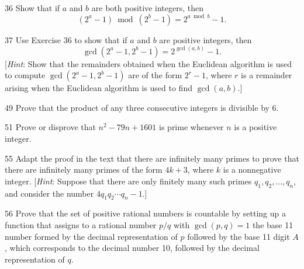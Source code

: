\documentclass[11pt]{article}
\begin{document}
\begin{exercise}{36}
    Show that if $a$ and $b$ are both positive integers, then
    \[
    (2^a - 1) \bmod (2^b - 1) = 2^{a \bmod b} - 1.
    \]
\end{exercise}

\begin{exercise}{37}
    Use Exercise 36 to show that if $a$ and $b$ are positive
    integers, then
    \[
    \gcd(2^a - 1, 2^b - 1) = 2^{\gcd(a,b)} - 1.
    \]
    [\emph{Hint}: Show that the remainders obtained when the
    Euclidean algorithm is used to compute
    $\gcd(2^a-1, 2^b-1)$ are of the form $2^r - 1$, where $r$ is a
    remainder arising when the Euclidean algorithm is used to find
    $\gcd(a,b)$.]
\end{exercise}

\begin{exercise}{49}
    Prove that the product of any three consecutive integers is
    divisible by 6.
\end{exercise}

\begin{exercise}{51}
    Prove or disprove that $n^2 - 79n + 1601$ is prime whenever $n$
    is a positive integer.
\end{exercise}

\begin{exercise}{55}
    Adapt the proof in the text that there are infinitely many primes
    to prove that there are infinitely many primes of the form
    $4k+3$, where $k$ is a nonnegative integer.
    [\emph{Hint}: Suppose that there are only finitely many such
    primes $q_1, q_2, \dots, q_n$, and consider the number
    $4q_1 q_2 \cdots q_n - 1$.]
\end{exercise}

\begin{exercise}{56}
    Prove that the set of positive rational numbers is countable by
    setting up a function that assigns to a rational number $p/q$
    with $\gcd(p,q) = 1$ the base 11 number formed by the decimal
    representation of $p$ followed by the base 11 digit $A$, which
    corresponds to the decimal number 10, followed by the decimal
    representation of $q$.
\end{exercise}
\end{document}
